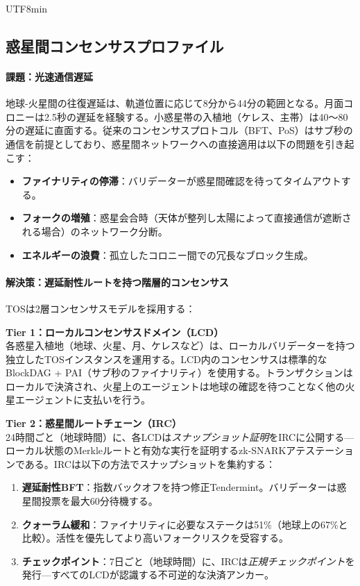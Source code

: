 \documentclass[11pt]{article}
\begin{document}
\begin{CJK}{UTF8}{min}
\subsection{惑星間コンセンサスプロファイル}

\paragraph{課題：光速通信遅延}
地球-火星間の往復遅延は、軌道位置に応じて8分から44分の範囲となる。月面コロニーは2.5秒の遅延を経験する。小惑星帯の入植地（ケレス、主帯）は40〜80分の遅延に直面する。従来のコンセンサスプロトコル（BFT、PoS）はサブ秒の通信を前提としており、惑星間ネットワークへの直接適用は以下の問題を引き起こす：
\begin{itemize}[noitemsep]
  \item \textbf{ファイナリティの停滞}：バリデーターが惑星間確認を待ってタイムアウトする。
  \item \textbf{フォークの増殖}：惑星会合時（天体が整列し太陽によって直接通信が遮断される場合）のネットワーク分断。
  \item \textbf{エネルギーの浪費}：孤立したコロニー間での冗長なブロック生成。
\end{itemize}

\paragraph{解決策：遅延耐性ルートを持つ階層的コンセンサス}
TOSは2層コンセンサスモデルを採用する：

\textbf{Tier 1：ローカルコンセンサスドメイン（LCD）}\\
各惑星入植地（地球、火星、月、ケレスなど）は、ローカルバリデーターを持つ独立したTOSインスタンスを運用する。LCD内のコンセンサスは標準的なBlockDAG + PAI（サブ秒のファイナリティ）を使用する。トランザクションはローカルで決済され、火星上のエージェントは地球の確認を待つことなく他の火星エージェントに支払いを行う。

\textbf{Tier 2：惑星間ルートチェーン（IRC）}\\
24時間ごと（地球時間）に、各LCDは\emph{スナップショット証明}をIRCに公開する—ローカル状態のMerkleルートと有効な実行を証明するzk-SNARKアテステーションである。IRCは以下の方法でスナップショットを集約する：
\begin{enumerate}[noitemsep]
  \item \textbf{遅延耐性BFT}：指数バックオフを持つ修正Tendermint。バリデーターは惑星間投票を最大60分待機する。
  \item \textbf{クォーラム緩和}：ファイナリティに必要なステークは51\%（地球上の67\%と比較）。活性を優先してより高いフォークリスクを受容する。
  \item \textbf{チェックポイント}：7日ごと（地球時間）に、IRCは\emph{正規チェックポイント}を発行—すべてのLCDが認識する不可逆的な決済アンカー。
\end{enumerate}


\end{CJK}
\end{document}
